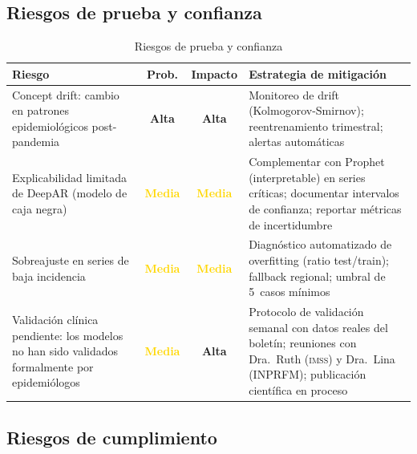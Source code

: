 \documentclass[12pt, letterpaper]{article}
\newcommand{\imss}{\textnormal{\textsc{imss}}}
\newcommand{\riskHigh}{\cellcolor{lightred}\textbf{\textcolor{burgundy}{Alta}}}
\newcommand{\riskMed}{\cellcolor{lightyellow}\textbf{\textcolor{gold}{Media}}}
\begin{document}
\subsection{Riesgos de prueba y confianza}

\begin{table}[H]
\centering
\caption{Riesgos de prueba y confianza}
\label{tab:riesgos_confianza}
\scriptsize
\setlength{\tabcolsep}{3pt}
\begin{tabularx}{\textwidth}{>{\raggedright\arraybackslash}X c c >{\raggedright\arraybackslash}X}
\toprule
\textbf{Riesgo} & \textbf{Prob.} & \textbf{Impacto} & \textbf{Estrategia de mitigación} \\
\midrule
Concept drift: cambio en patrones epidemiológicos post-pandemia & \riskHigh & \riskHigh & Monitoreo de drift (Kolmogorov-Smirnov); reentrenamiento trimestral; alertas automáticas \\
\addlinespace
Explicabilidad limitada de DeepAR (modelo de caja negra) & \riskMed & \riskMed & Complementar con Prophet (interpretable) en series críticas; documentar intervalos de confianza; reportar métricas de incertidumbre \\
\addlinespace
Sobreajuste en series de baja incidencia & \riskMed & \riskMed & Diagnóstico automatizado de overfitting (ratio test/train); fallback regional; umbral de 5~casos mínimos \\
\addlinespace
Validación clínica pendiente: los modelos no han sido validados formalmente por epidemiólogos & \riskMed & \riskHigh & Protocolo de validación semanal con datos reales del boletín; reuniones con Dra.~Ruth (\imss{}) y Dra.~Lina (INPRFM); publicación científica en proceso \\
\bottomrule
\end{tabularx}
\end{table}

\subsection{Riesgos de cumplimiento}
\end{document}

